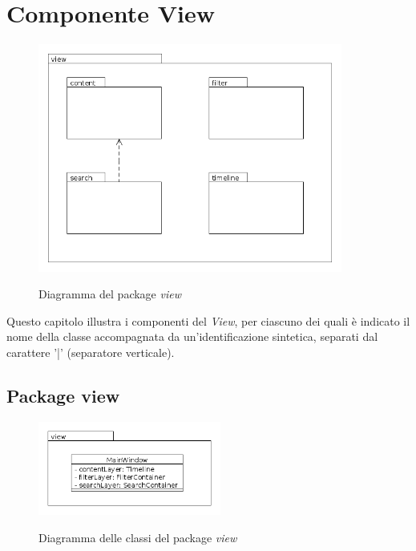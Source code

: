 \documentclass[10pt,a4paper,headinclude,footinclude,hidelinks]{scrreprt} %
\begin{document}
	\chapter{Componente View}
	\label{ch:stage:design:view}

	\begin{figure}[ht]
		\begin{center}
	    	\includegraphics[width=10cm]{package/view.png}
			\label{gfx:package:view}
			\caption{Diagramma del package \textit{view}}
		\end{center}
	\end{figure}

	Questo capitolo illustra i componenti del \textit{View}, per ciascuno dei quali è indicato il nome della classe accompagnata da un'identificazione sintetica, separati dal carattere '|' (separatore verticale).

	\section{Package view}
	\label{sec:stage:design:view}

	\begin{figure}[ht]
		\begin{center}
	    	\includegraphics[width=6cm]{class/view.png}
			\label{gfx:class:view}
			\caption{Diagramma delle classi del package \textit{view}}
		\end{center}
	\end{figure}
	
\end{document}
